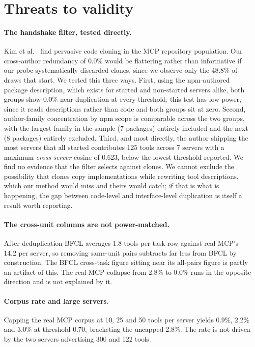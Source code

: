 \documentclass[11pt]{article}
\begin{document}
\section{Threats to validity}
\label{sec:threats}

\paragraph{The handshake filter, tested directly.}
Kim et al.~\cite{cloning} find pervasive code cloning in the MCP repository
population. Our cross-author redundancy of 0.0\% would be flattering rather than
informative if our probe systematically discarded clones, since we observe only
the 48.8\% of draws that start. We tested this three ways. First, using the
npm-authored package description, which exists for started and non-started servers
alike, both groups show 0.0\% near-duplication at every threshold; this test has
low power, since it reads descriptions rather than code and both groups sit at
zero. Second, author-family concentration by npm scope is comparable across the
two groups, with the largest family in the sample (7 packages) entirely included
and the next (8 packages) entirely excluded. Third, and most directly, the author
shipping the most servers that all started contributes 125 tools across 7 servers
with a maximum \emph{cross-server} cosine of 0.623, below the lowest threshold
reported. We find no evidence that the filter selects against clones. We cannot
exclude the possibility that clones copy implementations while rewriting tool
descriptions, which our method would miss and theirs would catch; if that is what
is happening, the gap between code-level and interface-level duplication is itself
a result worth reporting.

\paragraph{The cross-unit columns are not power-matched.}
After deduplication BFCL averages 1.8 tools per task row against real MCP's 14.2
per server, so removing same-unit pairs subtracts far less from BFCL by
construction. The BFCL cross-task figure sitting near its all-pairs figure is
partly an artifact of this. The real MCP collapse from 2.8\% to 0.0\% runs in the
opposite direction and is not explained by it.

\paragraph{Corpus rate and large servers.}
Capping the real MCP corpus at 10, 25 and 50 tools per server yields 0.9\%, 2.2\%
and 3.0\% at threshold 0.70, bracketing the uncapped 2.8\%. The rate is not driven
by the two servers advertising 300 and 122 tools.
\end{document}
